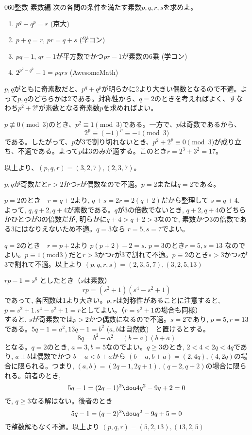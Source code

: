 \begin{thm}{060}{}{整数 素数編}
 次の各問の条件を満たす素数$p, q, r, s$を求めよ。
 \begin{enumerate}
  \item $p^q+q^p=r$ (京大)
  \item $p+q=r$, $pr=q+s$ (学コン)
  \item $pq-1$, $qr-1$が平方数でかつ$pr-1$が素数の6乗 (学コン)
  \item $2^{p^2-q^2}-1=pqrs$ (AwesomeMath)
 \end{enumerate}
\end{thm}

$p, q$がともに奇素数だと、$p^q+q^p$が明らかに2より大きい偶数となるので不適。よって$p, q$のどちらかは2である。対称性から、$q=2$のときを考えればよく、すなわち$p^2+2^p$が素数となる奇素数$p$を求めればよい。

$p\not\equiv 0 \pmod{3}$のとき、$p^2\equiv 1 \pmod{3}$である。一方で、$p$は奇数であるから、
\[ 2^p \equiv (-1)^p \equiv -1 \pmod{3} \]
である。したがって、$p$が3で割り切れないとき、$p^2+2^p\equiv 0 \pmod{3}$が成り立ち、不適である。よって$p$は3のみが適する。このとき$r=2^3+3^2=17$。

以上より、$(p, q, r)=(3, 2, 7), (2, 3, 7)$。

$p,q$が奇数だと$r>2$かつ$r$が偶数なので不適。$p=2$または$q=2$である。

$p=2$のとき　$r=q+2$より, $q+s=2r=2(q+2)$だから整理して $s=q+4$.　よって, $q,q+2,q+4$が素数である。$q$が3の倍数でないとき, $q+2, q+4$のどちらかひとつが3の倍数だが, 明らかに$q+4>q+2>3$なので, 素数かつ3の倍数である3にはなりえないため不適。$q=3$なら $r=5, s=7$でよい。

$q=2$のとき　$r=p+2$より $p(p+2)-2=s$. $p=3$のとき$r=5, s=13$ なのでよい。$p\equiv 1 　(\mbox{mod} 3)$だと$r>3$かつ$r$が3で割れて不適。$p\equiv 2$のとき$s>3$かつ$s$が3で割れて不適。以上より $(p,q,r,s)=(2,3,5,7), (3,2,5,13)$

$rp-1=s^6$ としたとき（$s$は素数）
\[rp=(s^2+1)(s^4-s^2+1)\]
であって, 各因数は1より大きい。$p,r$は対称性があることに注意すると, $p=s^2+1. s^4-s^2+1=r$としてよい。（$r=s^2+1$の場合も同様）\\
すると, $s$が奇素数では$p>2$かつ偶数になるので不適。$s=2$であり, $p=5, r=13$である。$5q-1=a^2, 13q-1=b^2$ ($a,b$は自然数)　と置けるとする。
\[8q=b^2-a^2=(b-a)(b+a)\]
となる。$q=2$のとき, $a=3, b=5$なのでよい。$q\geq 3$のとき, $2<4<2q<4q$であり, $a\pm b$は偶数でかつ $b-a<b+a$から $(b-a,b+a)=(2, 4q), (4,2q)$の場合に限られる。つまり, $(a,b)=(2q-1, 2q+1), (q-2, q+2)$の場合に限られる。前者のとき,
\[5q-1=(2q-1)^2 \dou 4q^2-9q+2=0\]
で, $q\geq 3$なる解はない。後者のとき
\[5q-1=(q-2)^2 \dou q^2-9q+5=0\]
で整数解もなく不適。以上より $(p,q,r)=(5,2,13), (13,2,5)$

